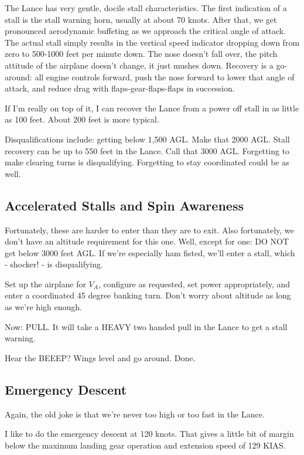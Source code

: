 The Lance has very gentle, docile stall characteristics. The first indication of a stall is the stall warning horn, usually at about 70 knots. After that, we get pronounced aerodynamic buffeting as we approach the critical angle of attack. The actual stall simply results in the vertical speed indicator dropping down from zero to 500-1000 feet per minute down. The nose doesn't fall over, the pitch attitude of the airplane doesn't change, it just mushes down. Recovery is a go-around: all engine controls forward, push the nose forward to lower that angle of attack, and reduce drag with flaps-gear-flaps-flaps in succession.

If I'm really on top of it, I can recover the Lance from a power off stall in as little as 100 feet. About 200 feet is more typical.

Disqualifications include: getting below 1,500 AGL. Make that 2000 AGL. Stall recovery can be up to 550 feet in the Lance. Call that 3000 AGL. Forgetting to make clearing turns is disqualifying. Forgetting to stay coordinated could be as well.

\subsection{Accelerated Stalls and Spin Awareness}

Fortunately, these are harder to enter than they are to exit. Also fortunately, we don't have an altitude requirement for this one. Well, except for one: DO NOT get below 3000 feet AGL. If we're especially ham fisted, we'll enter a stall, which - shocker! - is disqualifying.

Set up the airplane for $V_A$, configure as requested, set power appropriately, and enter a coordinated 45 degree banking turn. Don't worry about altitude as long as we're high enough.

Now: PULL. It will take a HEAVY two handed pull in the Lance to get a stall warning.

Hear the BEEEP? Wings level and go around. Done.

\subsection{Emergency Descent}

Again, the old joke is that we're never too high or too fast in the Lance.

I like to do the emergency descent at 120 knots. That gives a little bit of margin below the maximum landing gear operation and extension speed of 129 KIAS.

